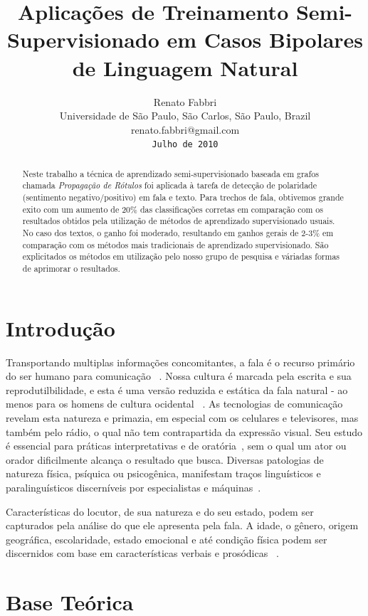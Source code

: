 \documentclass[12pt]{article}
\title{Aplicações de Treinamento Semi-Supervisionado em Casos Bipolares de Linguagem Natural}
\author{Renato Fabbri\\
Universidade de São Paulo, São Carlos, São Paulo, Brazil\\
{renato.fabbri@gmail.com}\\
{\tt Julho de 2010}}
\begin{document}
\maketitle
\begin{abstract}
Neste trabalho a técnica de aprendizado semi-supervisionado baseada em grafos chamada \emph{Propagação de Rótulos} foi aplicada à tarefa de detecção de polaridade (sentimento negativo/positivo) em fala e texto. Para trechos de fala, obtivemos grande exito com um aumento de 20\% das classificações corretas em comparação com os resultados obtidos pela utilização de métodos de aprendizado supervisionado usuais. No caso dos textos, o ganho foi moderado, resultando em ganhos gerais de 2-3\% em comparação com os métodos mais tradicionais de aprendizado supervisionado. São explicitados os métodos em utilização pelo nosso grupo de pesquisa e váriadas formas de aprimorar o resultados.
\end{abstract}

\section{Introdução}

Transportando multiplas informações concomitantes, a fala é o recurso primário do ser humano para comunicação ~\cite{spkl,flem}. Nossa cultura é marcada pela escrita e sua reprodutilbilidade, e esta é uma versão reduzida e estática da fala natural - ao menos para os homens de cultura ocidental ~\cite{guten}. As tecnologias de comunicação revelam esta natureza e primazia, em especial com os celulares e televisores, mas também pelo rádio, o qual não tem contrapartida da expressão visual. Seu estudo é essencial para práticas interpretativas e de oratória~\cite{teatro}, sem o qual um ator ou orador dificilmente alcança o resultado que busca. Diversas patologias de natureza física, psíquica ou psicogênica, manifestam traços linguísticos e paralinguísticos discerníveis por especialistas e máquinas~\cite{dalga,interactivevoice,humanmachine,benchmark}.

Características do locutor, de sua natureza e do seu estado, podem ser capturados pela análise do que ele apresenta pela fala. A idade, o gênero, origem geográfica, escolaridade, estado emocional e até condição física podem ser discernidos com base em características verbais e prosódicas ~\cite{interactivevoice}.

\section{Base Teórica}
\end{document}
